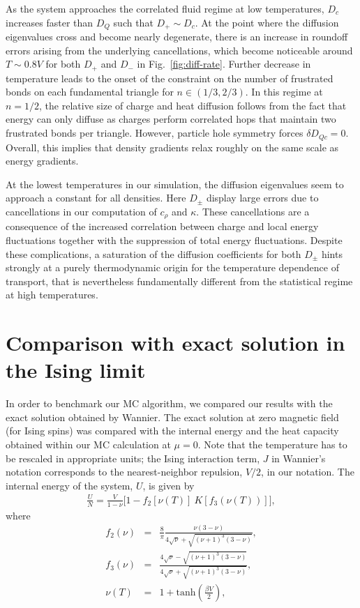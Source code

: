 \documentclass[aps,prx,onecolumn,amsmath,nofootinbib,amssymb,11pt]{revtex4-1}
\def \beq {\begin{eqnarray}}
\def \eeq {\end{eqnarray}}
\begin{document}
{\begin{appendix}
As the system approaches the correlated fluid regime at low temperatures, $D_c$ increases faster than $D_Q$ such that $D_+ \sim D_c$. At the point where the diffusion eigenvalues cross and become nearly degenerate, there is an increase in roundoff errors arising from the underlying cancellations, which become noticeable around $T\sim 0.8V$ for both $D_{+}$ and $D_{-}$ in Fig.~\ref{fig:diff-rate}. Further decrease in temperature leads to the onset of the constraint on the number of frustrated bonds on each fundamental triangle for $n\in (1/3,2/3)$. In this regime at $n=1/2$, the relative size of charge and heat diffusion follows from the fact that energy can only diffuse as charges perform correlated hops that maintain two frustrated bonds per triangle. However, particle hole symmetry forces $\delta D_{Qc}=0$. Overall, this implies that density gradients relax roughly on the same scale as energy gradients.

At the lowest temperatures in our simulation, the diffusion eigenvalues seem to approach a constant for all  densities. Here $D_{\pm}$ display large errors due to cancellations in our computation of $c_\rho$ and $\kappa$. These cancellations are a consequence of the increased correlation between charge and local energy fluctuations together with the suppression of total energy fluctuations.  
Despite these complications, a saturation of the diffusion coefficients for both $D_{\pm}$ hints strongly at a purely thermodynamic origin for the temperature dependence of transport, that is nevertheless fundamentally different from the statistical regime at high temperatures.



\section{Comparison with exact solution in the Ising limit}
\label{ap:Is}
In order to benchmark our MC algorithm, we compared our results with the exact solution obtained by Wannier. The exact solution at zero magnetic field (for Ising spins) was compared with the internal energy and the heat capacity obtained within our MC calculation at $\mu=0$. Note that the temperature has to be rescaled in appropriate units; the Ising interaction term, $J$ in Wannier's notation corresponds to the nearest-neighbor repulsion, $V/2$, in our notation. The internal energy of the system, $U$, is given by 
\beq
\frac{U}{N}=\frac{V}{1-\nu}\bigg[1-f_{2}\left[\nu\left(T\right)\right]~K\left[f_{3}\left(\nu\left(T\right)\right)\right]\bigg],
\eeq
where 
\beq
f_{2}\left(\nu\right) &=& \frac{8}{\pi}\frac{\nu\left(3-\nu\right)}{4\sqrt{\nu}+\sqrt{\left(\nu+1\right)^{3}\left(3-\nu\right)}},\\
f_{3}\left(\nu\right) &=& \frac{4\sqrt{\nu}-\sqrt{\left(\nu+1\right)^{3}\left(3-\nu\right)}}{4\sqrt{\nu}+\sqrt{\left(\nu+1\right)^{3}\left(3-\nu\right)}},\\
\nu\left(T\right) &=& 1+\text{tanh}\left(\frac{\beta V}{2}\right),
\eeq


\end{appendix}}
\end{document}
